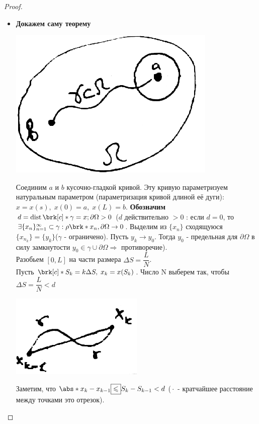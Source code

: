 \begin{theorem}
\begin{proof}
\begin{itemize}
\item
{\bf Докажем саму теорему}
\begin{center}
\includegraphics[scale=0.5]{22_1_new}
\end{center}
Соединим $a$ и $b$ кусочно-гладкой кривой. Эту кривую параметризуем натуральным параметром (параметризация кривой длиной её дуги): 
$x = x(s), \; x(0) = a, \; x(L) = b$.
{\bf Обозначим}
$d = \dist{\brk[c]*{\gamma = x; \partial{\Omega}}} > 0$
($d$ действительно $> 0$ : если $d = 0$, то 
$\exists\{x_n\}_{n=1}^\infty \subset \gamma: \rho\brk*{x_n, \partial\Omega}\to 0$.
 Выделим из $\{x_n\}$ сходящуюся $\{x_{n_k}\}=\{y_k\}$($\gamma$ - ограничено). Пусть $y_k \to y_0$. Тогда $y_0$ - предельная для
 $\partial \Omega$ в силу замкнутости 
 $y_0 \in \gamma \cup \partial \Omega \Rightarrow$ противоречие).\\
 Разобьем $[0,L]$ на части размера $\Delta S = \dfrac{L}{N}$.\\
 Пусть $\brk[c]*{S_k = k\Delta S, \; x_k = x(S_k)}$. 
 Число N выберем так, чтобы $\Delta S = \dfrac{L}{N} < d$\\
 \begin{center}
 \includegraphics[scale=0.5]{22_2_new}
 \end{center}
 Заметим, что $\abs*{x_k - x_{k-1}} \boxed{\leq} S_k - S_{k-1} < d$ ($\boxed{\cdot}$ - кратчайшее расстояние между точками это отрезок).
 \begin{center}

\end{center}
\end{itemize}
\end{proof}
\end{theorem}
